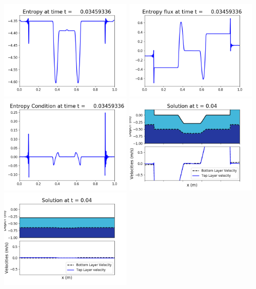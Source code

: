 \documentclass[11pt]{article}
\begin{document}
\vskip 10pt 
\includegraphics[width=0.475\textwidth]{frame0080fig1007.png}
\includegraphics[width=0.475\textwidth]{frame0080fig1008.png}
\vskip 10pt 
\includegraphics[width=0.475\textwidth]{frame0080fig1009.png}
\vskip 10pt 
\includegraphics[width=0.475\textwidth]{frame0081fig1001.png}
\includegraphics[width=0.475\textwidth]{frame0081fig1002.png}
\end{document}
